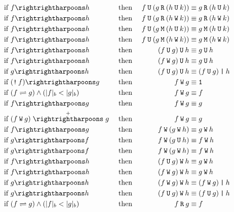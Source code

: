 \documentclass[a4paper,twoside,10pt,DIV=12]{scrreprt}
\newcommand{\U}{\mathbin{\texttt{U}}}
\newcommand{\R}{\mathbin{\texttt{R}}}
\newcommand{\M}{\mathbin{\texttt{M}}}
\newcommand{\W}{\mathbin{\texttt{W}}}
\DeclareMathOperator{\NOT}{\texttt{!}}
\newcommand{\OR}{\mathbin{\texttt{|}}}
\newcommand{\0}{\texttt{0}}
\newcommand{\1}{\texttt{1}}
\def\simp{\rightrightharpoons}
\def\Simp{\stackrel{+}{\simp}}
\begin{document}
\begin{alignat*}{3}
\text{if~} & f\simp h        &  & \text{~then~} & f\U (g \R (h \U k)) & \equiv g \R (h \U k)      \\
\text{if~} & f\simp h        &  & \text{~then~} & f\U (g \R (h \W k)) & \equiv g \R (h \W k)      \\
\text{if~} & f\simp h        &  & \text{~then~} & f\U (g \M (h \U k)) & \equiv g \M (h \U k)      \\
\text{if~} & f\simp h        &  & \text{~then~} & f\U (g \M (h \W k)) & \equiv g \M (h \W k)      \\
\text{if~} & f\simp h        &  & \text{~then~} & (f\U g) \U h        & \equiv g \U h             \\
\text{if~} & f\simp h        &  & \text{~then~} & (f\W g) \U h        & \equiv g \U h             \\
\text{if~} & g\simp h        &  & \text{~then~} & (f\U g) \U h        & \equiv (f \U g) \OR h     \\
\text{if~} & (\NOT f)\simp g &  & \text{~then~} & f\W g               & \equiv \1                 \\
\text{if~} & \flessg         &  & \text{~then~} & f\W g               & \equiv f                  \\
\text{if~} & f\simp g        &  & \text{~then~} & f\W g               & \equiv g                  \\
\text{if~} & (f\W g)\Simp g  &  & \text{~then~} & f\W g               & \equiv g                  \\
\text{if~} & f\simp g        &  & \text{~then~} & f\W (g \W h)        & \equiv g \W h             \\
\text{if~} & g\simp f        &  & \text{~then~} & f\W (g \U h)        & \equiv f \W h             \\
\text{if~} & g\simp f        &  & \text{~then~} & f\W (g \W h)        & \equiv f \W h             \\
\text{if~} & f\simp h        &  & \text{~then~} & (f\U g) \W h        & \equiv g \W h             \\
\text{if~} & f\simp h        &  & \text{~then~} & (f\W g) \W h        & \equiv g \W h             \\
\text{if~} & g\simp h        &  & \text{~then~} & (f\W g) \W h        & \equiv (f \W g) \OR h     \\
\text{if~} & g\simp h        &  & \text{~then~} & (f\U g) \W h        & \equiv (f \U g) \OR h     \\
\text{if~} & \flessg         &  & \text{~then~} & f\R g               & \equiv f                  \\

\end{alignat*}
\end{document}
